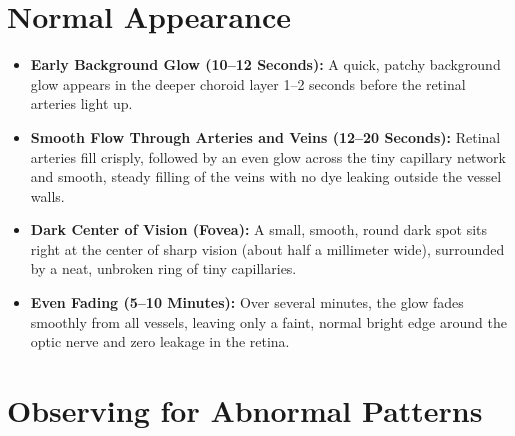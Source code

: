 \section{Normal Appearance}

\begin{itemize}
    \item \textbf{Early Background Glow (10--12 Seconds):} A quick, patchy background glow appears in the deeper choroid layer 1--2 seconds before the retinal arteries light up.
    \item \textbf{Smooth Flow Through Arteries and Veins (12--20 Seconds):} Retinal arteries fill crisply, followed by an even glow across the tiny capillary network and smooth, steady filling of the veins with no dye leaking outside the vessel walls.
    \item \textbf{Dark Center of Vision (Fovea):} A small, smooth, round dark spot sits right at the center of sharp vision (about half a millimeter wide), surrounded by a neat, unbroken ring of tiny capillaries.
    \item \textbf{Even Fading (5--10 Minutes):} Over several minutes, the glow fades smoothly from all vessels, leaving only a faint, normal bright edge around the optic nerve and zero leakage in the retina.
\end{itemize}

\section{Observing for Abnormal Patterns}

